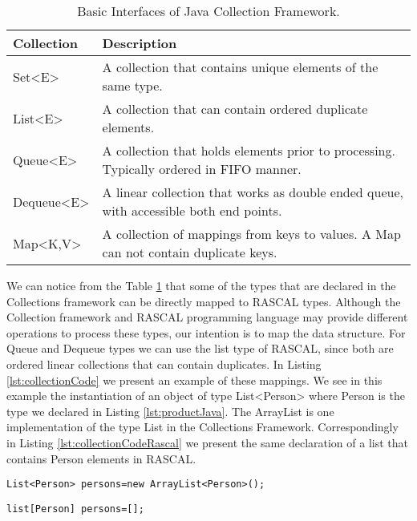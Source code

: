  \begin{table}[h]
 \centering
 \begin{tabular}{lp{8cm}}
\hline
Collection & Description \\ \hline
Set<E> & A collection that contains unique elements of the same type. \\
List<E> & A collection that can contain ordered duplicate elements. \\
Queue<E> & A collection that holds elements prior to processing. Typically ordered in FIFO manner. \\
Dequeue<E> & A linear collection that works as double ended queue, with accessible both end points. \\
Map<K,V> & A collection of mappings from keys to values. A Map can not contain duplicate keys.\\\hline
 \end{tabular}
 \label{tbl:CollectionFramework}
 \caption{Basic Interfaces of Java Collection Framework.}
 \end{table}
 
 
We can notice from the Table \ref{tbl:CollectionFramework} that some of the types that are declared in the Collections framework can be directly mapped to RASCAL types. Although the Collection framework and RASCAL programming language may provide different operations to process these types,  our intention is to map the data structure. For Queue and Dequeue types we can use the list type of RASCAL, since both are ordered linear collections that can contain duplicates. In Listing \ref{lst:collectionCode} we present an example of these mappings. We see in this example the instantiation of an object of type List<Person> where Person is the type we declared in Listing \ref{lst:productJava}. The ArrayList is one implementation of the type List in the Collections Framework.  Correspondingly in Listing \ref{lst:collectionCodeRascal} we present the same declaration of a list that contains Person elements in RASCAL.

\begin{lstlisting}[label=lst:collectionCode,caption=A list declaration in Java using the Collections Framework.]
List<Person> persons=new ArrayList<Person>();
\end{lstlisting}

\begin{lstlisting}[label=lst:collectionCodeRascal,caption=A list declaration in RASCAL.]
list[Person] persons=[];
\end{lstlisting}


